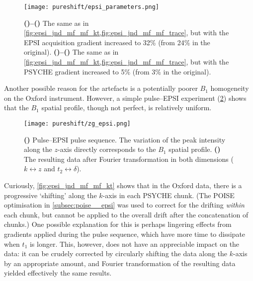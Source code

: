 \begin{figure}[htb]
    \centering
    \texttt{[image: pureshift/epsi\_parameters.png]}%
    {\label{fig:epsi_parameters_moreepsi_kt}}%
    {\label{fig:epsi_parameters_moreepsi_trace}}%
    {\label{fig:epsi_parameters_morepsyche_kt}}%
    {\label{fig:epsi_parameters_morepsyche_trace}}%
    \caption[Effects of varying acquisition parameters on ultrafast PSYCHE-iDOSY spectra]{
        \textbf{()--()} The same as in \cref{fig:epsi_jnd_mf_mf_kt,fig:epsi_jnd_mf_mf_trace}, but with the EPSI acquisition gradient increased to 32\% (from 24\% in the original).
        \textbf{()--()} The same as in \cref{fig:epsi_jnd_mf_mf_kt,fig:epsi_jnd_mf_mf_trace}, but with the PSYCHE gradient increased to 5\% (from 3\% in the original).        
    }
    \label{fig:epsi_parameters}
\end{figure}

Another possible reason for the artefacts is a potentially poorer $B_1$ homogeneity on the Oxford instrument.
However, a simple pulse--EPSI experiment (\cref{fig:zg_epsi}) shows that the $B_1$ spatial profile, though not perfect, is relatively uniform.

\begin{figure}[htb]
    \centering
    \texttt{[image: pureshift/zg\_epsi.png]}%
    {\label{fig:zg_epsi_pulseq}}%
    {\label{fig:zg_epsi_spec}}%
    \caption[Pulse--EPSI pulse sequence and data]{
        \textbf{()} Pulse--EPSI pulse sequence. The variation of the peak intensity along the $z$-axis directly corresponds to the $B_1$ spatial profile.
        \textbf{()} The resulting data after Fourier transformation in both dimensions ($k \leftrightarrow z$ and $t_2 \leftrightarrow \delta$).
    }
    \label{fig:zg_epsi}
\end{figure}

Curiously, \cref{fig:epsi_jnd_mf_mf_kt} shows that in the Oxford data, there is a progressive `shifting' along the $k$-axis in each PSYCHE chunk.
(The POISE optimisation in \cref{subsec:poise__epsi} was used to correct for the drifting \textit{within} each chunk, but cannot be applied to the overall drift after the concatenation of chunks.)
One possible explanation for this is perhaps lingering effects from gradients applied during the pulse sequence, which have more time to dissipate when $t_1$ is longer.
This, however, does not have an appreciable impact on the data: it can be crudely corrected by circularly shifting the data along the $k$-axis by an appropriate amount, and Fourier transformation of the resulting data yielded effectively the same results.

